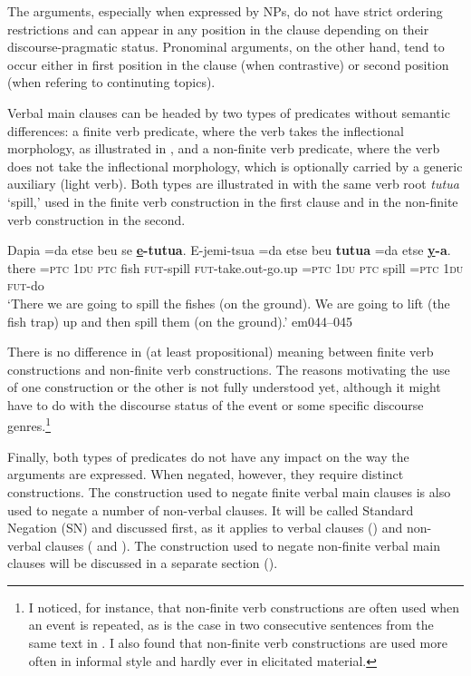\documentclass[output=paper]{langsci/langscibook}
\begin{document}
The arguments, especially when expressed by NPs, do not have strict ordering restrictions and can appear in any position in the clause depending on their discourse-pragmatic status. Pronominal arguments, on the other hand, tend to occur either in first position in the clause (when contrastive) or second position (when refering to continuting topics).

Verbal main clauses can be headed by two types of predicates without
semantic differences: a finite verb predicate,
where the verb takes the inflectional morphology, as illustrated in
, and a non-finite verb
predicate, where the verb does not take the inflectional morphology, which
is optionally carried by a generic auxiliary (light verb). Both types are
illustrated in  with the same verb root
\textit{tutua} `spill,' used in the finite verb construction in the first
clause and in the non-finite verb construction in the second.

\begin{exe}\ex
\label{ex:tacana-spill-the-fishes}
\gll Dapia  =da  etse  beu  se  \textbf{\uline{e}-tutua}.  E-jemi-tsua
=da  etse beu  \textbf{tutua}  =da  etse  \textbf{\uline{y}-a}.\\
    there  =\textsc{ptc}  \textsc{1du}  \textsc{ptc}  fish
    \textsc{fut}-spill  \textsc{fut}-take.out-go.up  =\textsc{ptc}
    1\textsc{du} \textsc{ptc}  spill  =\textsc{ptc}  1\textsc{du}
    \textsc{fut-}do\\ 
\glt `There we are going to spill the fishes (on the ground). We are going
to lift (the fish trap) up and then spill them (on the ground).' em044--045
\end{exe}

There is no difference in (at least propositional) meaning between finite
verb constructions and non-finite verb constructions. The reasons
motivating the use of one construction or the other is not fully understood
yet, although it might have to do with the discourse status of the event or
some specific discourse genres.\footnote{I noticed, for instance, that non-finite verb constructions are often used when an event is repeated, as is the case in two consecutive sentences from the same text in . I also found that non-finite verb constructions are used more often in informal style and hardly ever in elicitated material.}

Finally, both types of predicates do not have any impact on the way the
arguments are expressed. When negated, however, they require distinct
constructions. The construction used to negate finite verbal main clauses
is also used to negate a number of non-verbal clauses. It will be called
Standard Negation (SN) and discussed first, as it applies to
verbal clauses () and non-verbal clauses ( and ). The construction used to negate non-finite verbal main clauses will be discussed in a separate section ().
\end{document}
